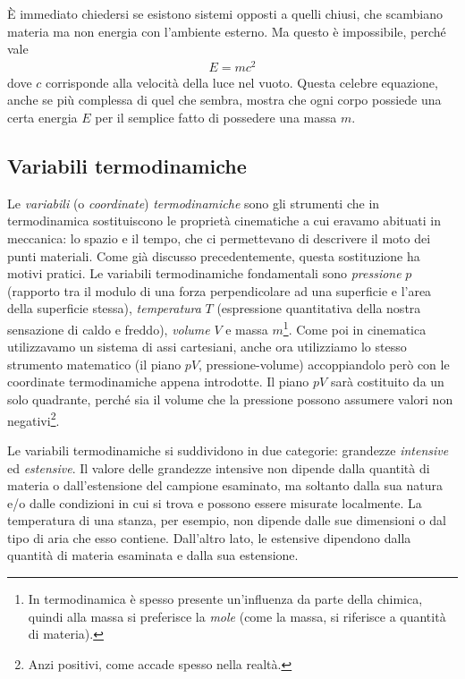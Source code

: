 \noindent È immediato chiedersi se esistono sistemi opposti a quelli chiusi, che
scambiano materia ma non energia con l'ambiente esterno. Ma questo
è impossibile, perché vale
\begin{align}
    E = mc^2
\end{align}
\noindent dove $c$ corrisponde alla velocità della luce nel vuoto.
Questa celebre equazione, anche se più complessa di quel che
sembra, mostra che ogni corpo possiede una certa energia $E$ per il semplice
fatto di possedere una massa $m$.

\subsection{Variabili termodinamiche}
Le \textit{variabili} (o \textit{coordinate}) \textit{termodinamiche}
sono gli strumenti che in termodinamica sostituiscono le proprietà
cinematiche a cui eravamo abituati in meccanica: lo spazio e il tempo,
che ci permettevano di descrivere il moto dei punti materiali.
Come già discusso precedentemente, questa sostituzione ha motivi pratici.
Le variabili termodinamiche fondamentali sono \textit{pressione} $p$
(rapporto tra il modulo di una forza perpendicolare ad una superficie
e l'area della superficie stessa), \textit{temperatura} $T$ (espressione
quantitativa della nostra sensazione di caldo e freddo), \textit{volume} $V$
e massa $m$\footnote{In termodinamica è spesso presente un'influenza da parte
della chimica, quindi alla massa si preferisce la \textit{mole} (come
la massa, si riferisce a quantità di materia).}. Come poi in cinematica
utilizzavamo un sistema di assi cartesiani, anche ora utilizziamo lo
stesso strumento matematico (il piano $pV$, pressione-volume) accoppiandolo però con le coordinate termodinamiche
appena introdotte. Il piano $pV$ sarà costituito da un solo quadrante,
perché sia il volume che la pressione possono assumere valori non
negativi\footnote{Anzi positivi, come accade spesso nella realtà.}.

Le variabili termodinamiche si suddividono in due categorie:
grandezze \textit{intensive} ed \textit{estensive}. Il valore delle
grandezze intensive non dipende dalla quantità di materia o dall'estensione
del campione esaminato, ma soltanto dalla sua natura e/o dalle
condizioni in cui si trova e possono essere misurate localmente.
La temperatura di una stanza, per esempio, non dipende dalle sue
dimensioni o dal tipo di aria che esso contiene. Dall'altro lato,
le estensive dipendono dalla quantità di materia esaminata e dalla
sua estensione.

